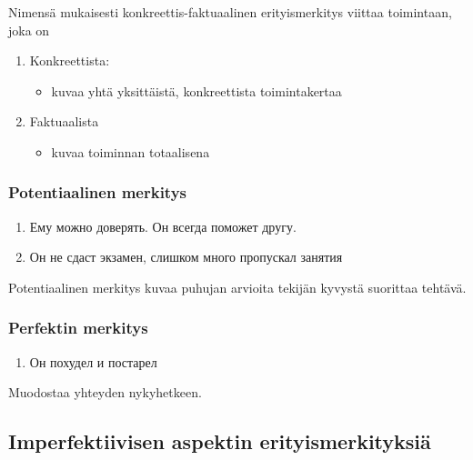 \documentclass[finnish,russian,]{article}
\begin{document}
Nimensä mukaisesti konkreettis-faktuaalinen erityismerkitys viittaa
toimintaan, joka on

\begin{enumerate}
\def\labelenumi{\arabic{enumi}.}
\itemsep1pt\parskip0pt
\item
  Konkreettista:

  \begin{itemize}
  \itemsep1pt\parskip0pt
  \item
    kuvaa yhtä yksittäistä, konkreettista toimintakertaa\\
  \end{itemize}
\item
  Faktuaalista

  \begin{itemize}
  \itemsep1pt\parskip0pt
  \item
    kuvaa toiminnan totaalisena
  \end{itemize}
\end{enumerate}

\subsubsection{Potentiaalinen merkitys}\label{potentiaalinen-merkitys}

\begin{enumerate}
\def\labelenumi{(\arabic{enumi})}
\setcounter{enumi}{4}
\itemsep1pt\parskip0pt
\item
  Ему можно доверять. Он всегда поможет другу.
\item
  Он не сдаст экзамен, слишком много пропускал занятия
\end{enumerate}

Potentiaalinen merkitys kuvaa puhujan arvioita tekijän kyvystä suorittaa
tehtävä.

\subsubsection{Perfektin merkitys}\label{perfektin-merkitys}

\begin{enumerate}
\def\labelenumi{(\arabic{enumi})}
\setcounter{enumi}{6}
\itemsep1pt\parskip0pt
\item
  Он похудел и постарел
\end{enumerate}

Muodostaa yhteyden nykyhetkeen.

\subsection{Imperfektiivisen aspektin
erityismerkityksiä}\label{imperfektiivisen-aspektin-erityismerkityksiuxe4}
\end{document}
